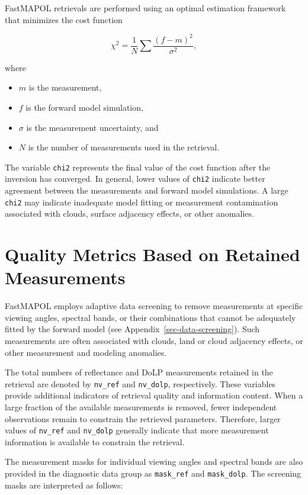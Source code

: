 \documentclass[
  11pt,
  letterpaper,
]{scrreprt}
\providecommand{\tightlist}{%
  \setlength{\itemsep}{0pt}\setlength{\parskip}{0pt}}
\begin{document}
FastMAPOL retrievals are performed using an optimal estimation framework
that minimizes the cost function

\[
\chi^2 = \frac{1}{N}\sum \frac{(f-m)^2}{\sigma^2},
\]

where

\begin{itemize}
\tightlist
\item
  \(m\) is the measurement,
\item
  \(f\) is the forward model simulation,
\item
  \(\sigma\) is the measurement uncertainty, and
\item
  \(N\) is the number of measurements used in the retrieval.
\end{itemize}

The variable \texttt{chi2} represents the final value of the cost
function after the inversion has converged. In general, lower values of
\texttt{chi2} indicate better agreement between the measurements and
forward model simulations. A large \texttt{chi2} may indicate inadequate
model fitting or measurement contamination associated with clouds,
surface adjacency effects, or other anomalies.

\section{Quality Metrics Based on Retained
Measurements}\label{quality-metrics-based-on-retained-measurements}

FastMAPOL employs adaptive data screening to remove measurements at
specific viewing angles, spectral bands, or their combinations that
cannot be adequately fitted by the forward model (see
Appendix~\ref{sec-data-screening}). Such measurements are often
associated with clouds, land or cloud adjacency effects, or other
measurement and modeling anomalies.

The total numbers of reflectance and DoLP measurements retained in the
retrieval are denoted by \texttt{nv\_ref} and \texttt{nv\_dolp},
respectively. These variables provide additional indicators of retrieval
quality and information content. When a large fraction of the available
measurements is removed, fewer independent observations remain to
constrain the retrieved parameters. Therefore, larger values of
\texttt{nv\_ref} and \texttt{nv\_dolp} generally indicate that more
measurement information is available to constrain the retrieval.

The measurement masks for individual viewing angles and spectral bands
are also provided in the diagnostic data group as \texttt{mask\_ref} and
\texttt{mask\_dolp}. The screening masks are interpreted as follows:
\end{document}
